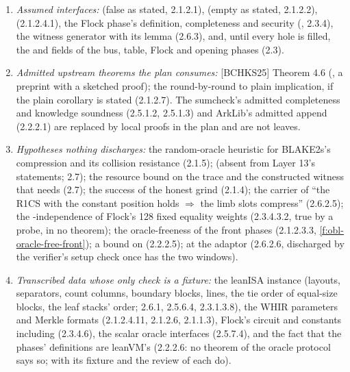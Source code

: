 \begin{enumerate}[label=\arabic*.]
\item \emph{Assumed interfaces:}  (false as stated, 2.1.2.1),  (empty as stated, 2.1.2.2),  (2.1.2.4.1), the Flock phase's definition, completeness and security (, 2.3.4), the witness generator  with its lemma (2.6.3), and, until every hole is filled, the  and  fields of the bus, table, Flock and opening phases (2.3).
\item \emph{Admitted upstream theorems the plan consumes:} [BCHKS25] Theorem 4.6 (, a preprint with a sketched proof); the round-by-round to plain implication, if the plain corollary is stated (2.1.2.7). The sumcheck's admitted completeness and knowledge soundness (2.5.1.2, 2.5.1.3) and ArkLib's admitted append (2.2.2.1) are replaced by local proofs in the plan and are not leaves.
\item \emph{Hypotheses nothing discharges:} the random-oracle heuristic for BLAKE2s's compression and its collision resistance (2.1.5);  (absent from Layer 13's statements; 2.7); the resource bound on the trace and the constructed witness that  needs (2.7); the success of the honest grind (2.1.4); the carrier of ``the R1CS with the constant position holds \ensuremath{\Rightarrow} the limb slots compress'' (2.6.2.5); the -independence of Flock's 128 fixed equality weights (2.3.4.3.2, true by a probe, in no theorem); the oracle-freeness of the front phases (2.1.2.3.3, \cref{f:obl-oracle-free-front}); a bound on  (2.2.2.5);  at the adaptor (2.6.2.6, discharged by the verifier's setup check once  has the two windows).
\item \emph{Transcribed data whose only check is a fixture:} the leanISA instance (layouts, separators, count columns, boundary blocks, lines, the tie order of equal-size blocks, the leaf stacks' order; 2.6.1, 2.5.6.4, 2.3.1.3.8), the WHIR parameters and Merkle formats (2.1.2.4.11, 2.1.2.6, 2.1.1.3), Flock's circuit and constants including  (2.3.4.6), the scalar oracle interfaces (2.5.7.4), and the fact that the phases' definitions are leanVM's (2.2.2.6: no theorem of the oracle protocol says so;  with its fixture and the review of each  do).
\end{enumerate}

